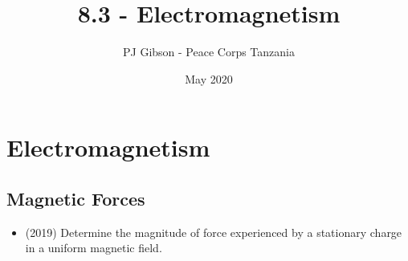 \documentclass{article}
\title{8.3 - Electromagnetism}
\author{PJ Gibson - Peace Corps Tanzania}
\date{May 2020}
\begin{document}
\maketitle


\section{Electromagnetism}

\subsection{Magnetic Forces}
\begin{itemize}
\item (2019)  Determine the magnitude of force experienced by a stationary charge in a uniform magnetic field. 
\end{itemize}
\end{document}
